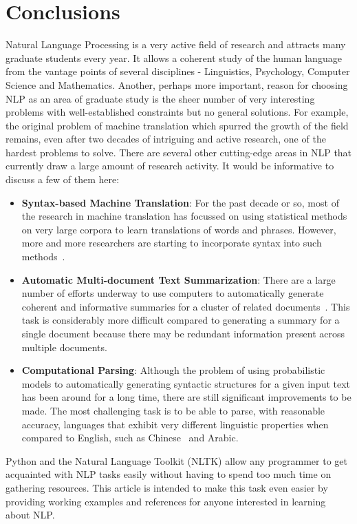 \documentclass[11pt]{article}
\begin{document}
\section{Conclusions} %
\label{sec:conclusions}
Natural Language Processing is a very active field of research and attracts many graduate students every year. It allows a coherent study of the human language from the vantage points of several disciplines - Linguistics, Psychology, Computer Science and Mathematics. Another, perhaps more important, reason for choosing NLP as an area of graduate study is the sheer number of very interesting problems with well-established constraints but no general solutions. For example, the original problem of machine translation which spurred the growth of the field remains, even after two decades of intriguing and active research, one of the hardest problems to solve. There are several other cutting-edge areas in NLP that currently draw a large amount of research activity. It would be informative to discuss a few of them here:
\begin{itemize}
    \item \textbf{Syntax-based Machine Translation}: For the past decade or so, most of the research in machine translation has focussed on using statistical methods on very large corpora to learn translations of words and phrases. However, more and more researchers are starting to incorporate syntax into such methods~\cite{ssmt}.
    \item \textbf{Automatic Multi-document Text Summarization}: There are a large number of efforts underway to use computers to automatically generate coherent and informative summaries for a cluster of related documents~\cite{multidocsummary}. This task is considerably more difficult compared to generating a summary for a single document because there may be redundant information present across multiple documents.
    \item \textbf{Computational Parsing}: Although the problem of using probabilistic models to automatically generating syntactic structures for a given input text has been around for a long time, there are still significant improvements to be made. The most challenging task is to be able to parse, with reasonable accuracy, languages that exhibit very different linguistic properties when compared to English, such as Chinese~\cite{parsing} and Arabic.
\end{itemize}

\noindent Python and the Natural Language Toolkit (NLTK) allow any programmer to get acquainted with NLP tasks easily without having to spend too much time on gathering resources. This article is intended to make this task even easier by providing working examples and references for anyone interested in learning about NLP.
\end{document}
